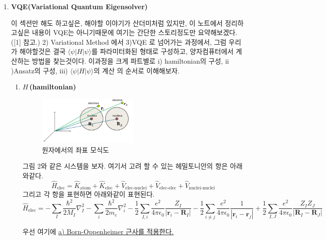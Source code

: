 \documentclass[10pt]{article}
\begin{document}
\begin{enumerate}[label=3)]
\item {\Large \textbf{VQE(Variational Quantum Eigensolver)}}

이 섹션만 해도 하고싶은, 해야할 이야기가 산더미처럼 있지만, 이 노트에서 정리하고싶은 내용이 VQE는 아니기때문에 여기는 간단한 스토리정도만 요약해보겠다.([1] 참고.)
2) Variational Method 에서 3)VQE 로 넘어가는 과정에서, 그럼 우리가 해야할것은 결국 \(\langle \psi|H|\psi \rangle\)를 파라미터화된 형태로 구성하고, 양자컴퓨터에서 계산하는 방법을 찾는것이다. 
이과정을 크게 파트별로 \(\mathrm{i}\)) hamiltonian의 구성, \(\mathrm{ii}\))Ansatz의 구성, \(\mathrm{iii}\)) \(\langle \psi|H|\psi \rangle\)의 계산 의 순서로 이해해보자. 
\begin{enumerate}[label=\(\mathrm{i}\))]
\item {\(H\)\,\textbf{(hamiltonian)}}

\begin{figure}[htbp]
  \centering
  \includegraphics[width=0.5\textwidth]{fig/원자좌표.png}
  \caption{원자에서의 좌표 모식도}
  \label{fig:example2}
\end{figure}

그림 2와 같은 시스템을 보자. 여기서 고려 할 수 있는 헤밀토니안의 항은 아래와같다. 
\[
\hat{H}_{\text{elec}} = \hat{K}_{\text{atom}} + \hat{K}_{\text{elec}} 
+ \hat{V}_{\text{elec-nuclei}} + \hat{V}_{\text{elec-elec}} + \hat{V}_{\text{nuclei-nuclei}}
\]
그리고 각 항을 표현하면 아래와같이 표현된다. 
\[
\hat{H}_{\text{elec}} = - \sum_I \frac{\hbar^2}{2 M_I} \nabla_I^2
- \sum_i \frac{\hbar^2}{2 m_e} \nabla_i^2
- \frac{1}{2} \sum_{I,i} \frac{e^2}{4 \pi \epsilon_0} \frac{Z_I}{|\mathbf{r}_i - \mathbf{R}_I|}
- \frac{1}{2} \sum_{i \ne j} \frac{e^2}{4 \pi \epsilon_0} \frac{1}{|\mathbf{r}_i - \mathbf{r}_j|}
+ \frac{1}{2} \sum_{I,J} \frac{e^2}{4 \pi \epsilon_0} \frac{Z_I Z_J}{|\mathbf{R}_I - \mathbf{R}_J|}
\]

우선 여기에 \underline{a) Born-Oppenheimer 근사를 적용한다.} 
\begin{tcolorbox}[enhanced, breakable, colback=gray!10, colframe=black, title=Definition: Born-oppenheimer Approximation]



\end{tcolorbox}
\end{enumerate}
\end{enumerate}
\end{document}
